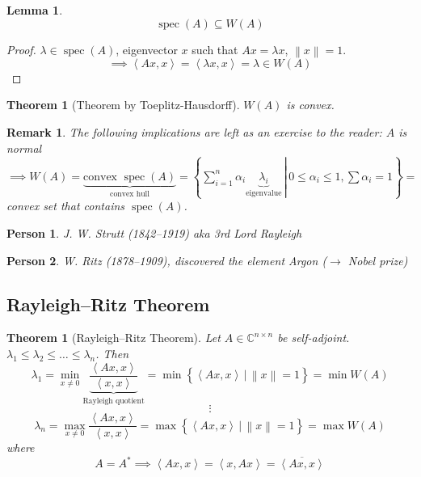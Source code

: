 \documentclass[a4paper]{article}
\newcounter{lecref}[section]
\numberwithin{lecref}{section}
\newtheorem{theorem}[lecref]{Theorem}
\newtheorem{lemma}[lecref]{Lemma}
\newtheorem*{Remark}{Remark}
\newtheorem*{Person}{Person}
\newcommand{\setdef}[2]{\left\{\left.#1\,\right|\,#2\right\}}
\newcommand{\angel}[1]{\left\langle#1\right\rangle}
\newcommand{\norm}[1]{\left\|#1\right\|}
\begin{document}
\begin{lemma}
  \[ \operatorname{spec}(A) \subseteq W(A) \]
\end{lemma}
\begin{proof}
  $\lambda \in \operatorname{spec}(A)$, eigenvector $x$ such that $Ax = \lambda x$, $\norm{x} = 1$.
  \[ \implies \angel{Ax, x} = \angel{\lambda x, x} = \lambda \in W(A) \]
\end{proof}

\begin{theorem}[Theorem by Toeplitz-Hausdorff]
  $W(A)$ is convex.
\end{theorem}
\begin{Remark}
  The following implications are left as an exercise to the reader:
  $A$ is normal $\implies W(A) = \underbrace{\text{convex } \operatorname{spec}(A)}_{\text{convex hull}} = \setdef{\sum_{i=1}^n \alpha_i \underbrace{\lambda_i}_{\text{eigenvalue}}}{0 \leq \alpha_i \leq 1, \sum \alpha_i = 1} =$ convex set that contains $\operatorname{spec}(A)$.
\end{Remark}

\begin{Person}
  J. W. Strutt (1842--1919) aka 3rd Lord Rayleigh
\end{Person}

\begin{Person}
  W. Ritz (1878--1909), discovered the element Argon ($\rightarrow$ Nobel prize)
\end{Person}

\subsection{Rayleigh--Ritz Theorem}

\begin{theorem}[Rayleigh--Ritz Theorem] %
  \label{rrthm}
  Let $A \in \mathbb C^{n \times n}$ be self-adjoint.
  $\lambda_1 \leq \lambda_2 \leq \dots \leq \lambda_n$.
  Then
  \[ \lambda_1 = \min_{x \neq 0}\underbrace{\frac{\angel{Ax, x}}{\angel{x, x}}}_{\text{Rayleigh quotient}} = \min\setdef{\angel{Ax, x}}{\norm{x} = 1} = \min{W(A)} \]
  \[ \vdots \]
  \[ \lambda_n = \max_{x \neq 0}\frac{\angel{Ax, x}}{\angel{x, x}} = \max\setdef{\angel{Ax, x}}{\norm{x} = 1} = \max{W(A)} \]
  where
  \[ A = A^* \implies \angel{Ax, x} = \angel{x, Ax} = \overline{\angel{Ax, x}} \]
\end{theorem}
\end{document}
